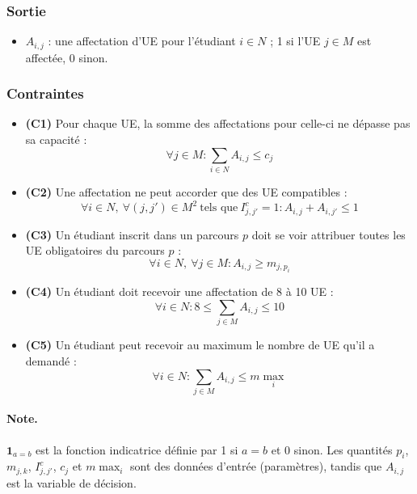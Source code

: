 \documentclass{rapport}
\theoremstyle{definition}
\theoremstyle{remark}
\theoremstyle{plain}
\theoremstyle{definition}
\theoremstyle{definition}
\theoremstyle{remark}
\theoremstyle{definition}
\begin{document}
\subsubsection{Sortie}
\begin{itemize}
    \item $A_{i,j}$ : une affectation d'UE pour l'étudiant $i \in N$ ; 1 si l'UE $j \in M$ est affectée, 0 sinon.
\end{itemize}

\subsubsection{Contraintes}
\begin{itemize}
    \item[] \textbf{(C1)} \og Pour chaque UE, la somme des affectations pour celle-ci ne dépasse pas sa capacité \fg{} :
    \[
    \forall j \in M : \sum_{i \in N} A_{i,j} \le c_j
    \]

    \item[] \textbf{(C2)} \og Une affectation ne peut accorder que des UE compatibles \fg{} :
    \[
    \forall i \in N,\ \forall (j,j') \in M^2\ \text{tels que}\ I^c_{j,j'} = 1 : A_{i,j} + A_{i,j'} \le 1
    \]

    \item[] \textbf{(C3)} \og Un étudiant inscrit dans un parcours $p$ doit se voir attribuer toutes les UE obligatoires du parcours $p$ \fg{} :
    \[
    \forall i \in N,\ \forall j \in M : A_{i,j} \ge m_{j,p_i}
    \]

    \item[] \textbf{(C4)} \og Un étudiant doit recevoir une affectation de 8 à 10 UE \fg{} :
    \[
    \forall i \in N : 8 \le \sum_{j \in M} A_{i,j} \le 10
    \]

    \item[] \textbf{(C5)} \og Un étudiant peut recevoir au maximum le nombre de UE qu'il a demandé \fg{} :
    \[
    \forall i \in N : \sum_{j \in M} A_{i,j} \le m\!\max_i
    \]
\end{itemize}

\paragraph{Note.}
$\mathbf{1}_{a=b}$ est la fonction indicatrice définie par 1 si $a=b$ et 0 sinon. Les quantités $p_i$, $m_{j,k}$, $I^c_{j,j'}$, $c_j$ et $m\!\max_i$ sont des données d'entrée (paramètres), tandis que $A_{i,j}$ est la variable de décision.
\end{document}

